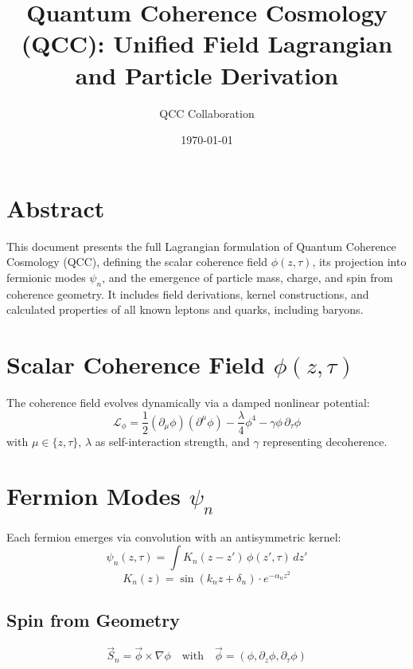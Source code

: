 \documentclass[12pt]{article}
\title{Quantum Coherence Cosmology (QCC): Unified Field Lagrangian and Particle Derivation}
\author{QCC Collaboration}
\date{\today}
\begin{document}
\maketitle

\section*{Abstract}
This document presents the full Lagrangian formulation of Quantum Coherence Cosmology (QCC), defining the scalar coherence field \( \phi(z, \tau) \), its projection into fermionic modes \( \psi_n \), and the emergence of particle mass, charge, and spin from coherence geometry. It includes field derivations, kernel constructions, and calculated properties of all known leptons and quarks, including baryons.

\section{Scalar Coherence Field \( \phi(z, \tau) \)}
The coherence field evolves dynamically via a damped nonlinear potential:
\begin{equation}
\mathcal{L}_\phi = \frac{1}{2}(\partial_\mu \phi)(\partial^\mu \phi) - \frac{\lambda}{4} \phi^4 - \gamma \phi \, \partial_\tau \phi
\end{equation}
with \( \mu \in \{z, \tau\} \), \( \lambda \) as self-interaction strength, and \( \gamma \) representing decoherence.

\section{Fermion Modes \( \psi_n \)}
Each fermion emerges via convolution with an antisymmetric kernel:
\begin{equation}
\psi_n(z, \tau) = \int K_n(z - z') \, \phi(z', \tau) \, dz'
\end{equation}
\begin{equation}
K_n(z) = \sin(k_n z + \delta_n) \cdot e^{-\alpha_n z^2}
\end{equation}

\subsection*{Spin from Geometry}
\begin{equation}
\vec{S}_n = \vec{\phi} \times \nabla \phi \quad \text{with} \quad \vec{\phi} = (\phi, \partial_z \phi, \partial_\tau \phi)
\end{equation}
\end{document}
